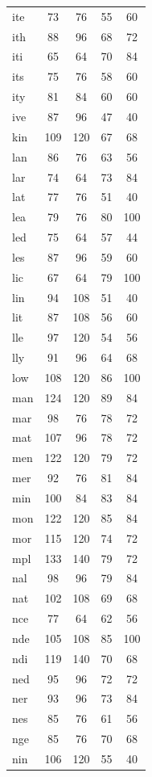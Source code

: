 \documentclass[ms,electronic,twosidetoc,letterpaper,chaptercenter,parttop,lof,lot]{byumsphd}
\begin{document}
\begin{table}
\begin{tabular}{| l | c c | c c |}
  ite & 73 & 76 & 55 & 60 \\
  ith & 88 & 96 & 68 & 72 \\
  iti & 65 & 64 & 70 & 84 \\
  its & 75 & 76 & 58 & 60 \\
  ity & 81 & 84 & 60 & 60 \\
  ive & 87 & 96 & 47 & 40 \\
  kin & 109 & 120 & 67 & 68 \\
  lan & 86 & 76 & 63 & 56 \\
  lar & 74 & 64 & 73 & 84 \\
  lat & 77 & 76 & 51 & 40 \\
  lea & 79 & 76 & 80 & 100 \\
  led & 75 & 64 & 57 & 44 \\
  les & 87 & 96 & 59 & 60 \\
  lic & 67 & 64 & 79 & 100 \\
  lin & 94 & 108 & 51 & 40 \\
  lit & 87 & 108 & 56 & 60 \\
  lle & 97 & 120 & 54 & 56 \\
  lly & 91 & 96 & 64 & 68 \\
  low & 108 & 120 & 86 & 100 \\
  man & 124 & 120 & 89 & 84 \\
  mar & 98 & 76 & 78 & 72 \\
  mat & 107 & 96 & 78 & 72 \\
  men & 122 & 120 & 79 & 72 \\
  mer & 92 & 76 & 81 & 84 \\
  min & 100 & 84 & 83 & 84 \\
  mon & 122 & 120 & 85 & 84 \\
  mor & 115 & 120 & 74 & 72 \\
  mpl & 133 & 140 & 79 & 72 \\
  nal & 98 & 96 & 79 & 84 \\
  nat & 102 & 108 & 69 & 68 \\
  nce & 77 & 64 & 62 & 56 \\
  nde & 105 & 108 & 85 & 100 \\
  ndi & 119 & 140 & 70 & 68 \\
  ned & 95 & 96 & 72 & 72 \\
  ner & 93 & 96 & 73 & 84 \\
  nes & 85 & 76 & 61 & 56 \\
  nge & 85 & 76 & 70 & 68 \\
  nin & 106 & 120 & 55 & 40 \\

\end{tabular}
\end{table}
\end{document}

